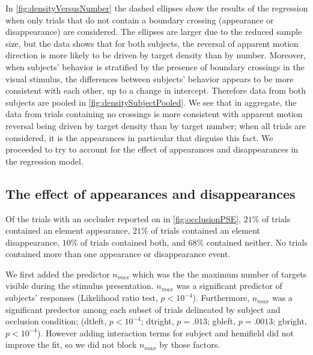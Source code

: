 \documentclass[../manuscript]{subfiles}
\begin{document}
In \autoref{fig:densityVersusNumber} the dashed ellipses show the results of the regression when only trials that do not contain a boundary crossing (appearance or disappearance) are considered. The ellipses are larger due to the reduced sample size, but the data shows that for both subjects, the reversal of apparent motion direction is more likely to be driven by target density than by number. Moreover, when subjects' behavior is stratified by the presence of boundary crossings in the visual stimulus, the differences between subjects' behavior appears to be more consistent with each other,  up to a change in intercept. Therefore data from both subjects are pooled in \autoref{fig:densitySubjectPooled}. We see that in aggregate, the data from trials containing no crossings is more consistent with apparent motion reversal being driven by target density than by target number; when all trials are considered, it is the appearances in particular that disguise this fact. We proceeded to try to account for the effect of appearances and disappearances in the regression model. 

\subsection{The effect of appearances and disappearances}


Of the trials with an occluder reported on in \autoref{fig:occlusionPSE},  \ensuremath{ 21 \%} of trials contained an element appearance, \ensuremath{ 21 \%} of trials contained an element disappearance, \ensuremath{ 10 \%} of trials contained both, and \ensuremath{ 68 \%} contained neither. No trials contained more than one appearance or disappearance event.

 We first added the predictor $n_{max}$ which was the the maximum number of targets visible during the stimulus presentation. $n_{max}$ was a significant predictor of subjects' responses (Likelihood ratio test, \ensuremath{p < 10^{-4}}). Furthermore, $n_{max}$ was a significant predector among each subset of trials delineated by subject and occlusion condition; (dtleft, \ensuremath{p < 10^{-4}}; dtright, \ensuremath{p = .013}; gbleft, \ensuremath{p = .0013}; gbright, \ensuremath{p < 10^{-4}}). However adding interaction terms for subject and hemifield did not improve the fit, so we did not block $n_{max}$ by those factors.
\end{document}
